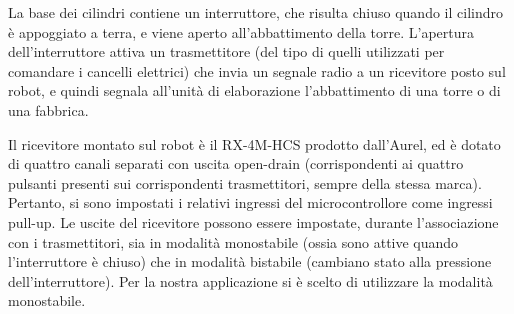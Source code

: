 La base dei cilindri contiene un interruttore, che risulta chiuso quando il cilindro è appoggiato a terra, e viene aperto all'abbattimento della torre. L'apertura dell'interruttore attiva un trasmettitore (del tipo di quelli utilizzati per comandare i cancelli elettrici) che invia un segnale radio a un ricevitore posto sul robot, e quindi segnala all'unità di elaborazione l'abbattimento di una torre o di una fabbrica.

Il ricevitore montato sul robot è il RX-4M-HCS prodotto dall'Aurel, ed è dotato di quattro canali separati con uscita open-drain (corrispondenti ai quattro pulsanti presenti sui corrispondenti trasmettitori, sempre della stessa marca). Pertanto, si sono impostati i relativi ingressi del microcontrollore come ingressi pull-up. Le uscite del ricevitore possono essere impostate, durante l'associazione con i trasmettitori, sia in modalità monostabile (ossia sono attive quando l'interruttore è chiuso) che in modalità bistabile (cambiano stato alla pressione dell'interruttore). Per la nostra applicazione si è scelto di utilizzare la modalità monostabile.  %